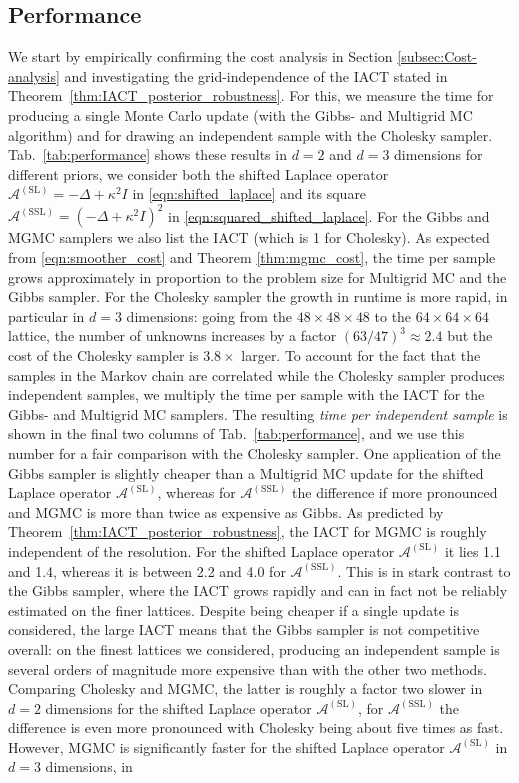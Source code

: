 \documentclass[11pt,english]{article}
\theoremstyle{plain}
\theoremstyle{plain}
\theoremstyle{plain}
\theoremstyle{plain}
\numberwithin{equation}{section}
\newcommand*{\id}{I}
\begin{document}
\subsection{Performance}\label{sec:results_performance}
We start by empirically confirming the cost analysis in Section \ref{subsec:Cost-analysis} and investigating the grid-independence of the IACT stated in Theorem~\ref{thm:IACT_posterior_robustness}. For this, we measure the time for producing a single Monte Carlo update (with the Gibbs- and Multigrid MC algorithm) and for drawing an independent sample with the Cholesky sampler. Tab.~\ref{tab:performance} shows these results in $d=2$ and $d=3$ dimensions for different priors, we consider both the shifted Laplace operator $\mathcal{A}^{(\mathrm{SL})} = -\Delta+\kappa^2\id$ in \eqref{eqn:shifted_laplace} and its square $\mathcal{A}^{(\mathrm{SSL})} = (-\Delta+\kappa^2\id)^2$ in \eqref{eqn:squared_shifted_laplace}. For the Gibbs and MGMC samplers we also list the IACT (which is 1 for Cholesky). As expected from \eqref{eqn:smoother_cost} and Theorem \ref{thm:mgmc_cost}, the time per sample grows approximately in proportion to the problem size for Multigrid MC and the Gibbs sampler. For the Cholesky sampler the growth in runtime is more rapid, in particular in $d=3$ dimensions: going from the $48\times48\times48$ to the $64\times64\times64$ lattice, the number of unknowns increases by a factor $(63/47)^3\approx 2.4$ but the cost of the Cholesky sampler is $3.8\times$ larger. To account for the fact that the samples in the Markov chain are correlated while the Cholesky sampler produces independent samples, we multiply the time per sample with the IACT for the Gibbs- and Multigrid MC samplers. The resulting \textit{time per independent sample} is shown in the final two columns of Tab.~\ref{tab:performance}, and we use this number for a fair comparison with the Cholesky sampler. One application of the Gibbs sampler is slightly cheaper than a Multigrid MC update for the shifted Laplace operator $\mathcal{A}^{(\mathrm{SL})}$, whereas for $\mathcal{A}^{(\mathrm{SSL})}$ the difference if more pronounced and MGMC is more than twice as expensive as Gibbs. As predicted by Theorem~\ref{thm:IACT_posterior_robustness}, the IACT for MGMC is roughly independent of the resolution. For the shifted Laplace operator $\mathcal{A}^{(\mathrm{SL})}$ it lies 1.1 and 1.4, whereas it is between 2.2 and 4.0 for $\mathcal{A}^{(\mathrm{SSL})}$. This is in stark contrast to the Gibbs sampler, where the IACT grows rapidly and can in fact not be reliably estimated on the finer lattices. Despite being cheaper if a single update is considered, the large IACT means that the Gibbs sampler is not competitive overall: on the finest lattices we considered, producing an independent sample is several orders of magnitude more expensive than with the other two methods. Comparing Cholesky and MGMC, the latter is roughly a factor two slower in $d=2$ dimensions for the shifted Laplace operator $\mathcal{A}^{(\mathrm{SL})}$, for $\mathcal{A}^{(\mathrm{SSL})}$ the difference is even more pronounced with Cholesky being about five times as fast. However, MGMC is significantly faster for the shifted Laplace operator $\mathcal{A}^{(\mathrm{SL})}$ in $d=3$ dimensions, in 
\end{document}
